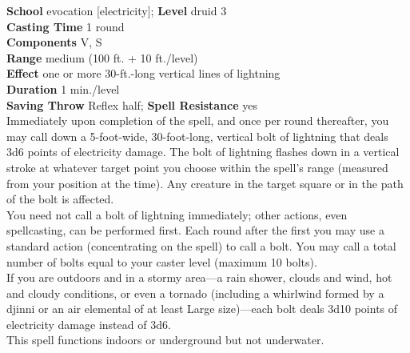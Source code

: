\textbf{School} evocation [electricity]; \textbf{Level} druid 3\\
\textbf{Casting Time} 1 round\\
\textbf{Components} V, S\\
\textbf{Range }medium (100 ft. + 10 ft./level)\\
\textbf{Effect} one or more 30-ft.-long vertical lines of lightning\\
\textbf{Duration} 1 min./level\\
\textbf{Saving Throw} Reflex half; \textbf{Spell Resistance} yes\\
Immediately upon completion of the spell, and once per round thereafter, you may call down a 5-foot-wide, 30-foot-long, vertical bolt of lightning that deals 3d6 points of electricity damage. The bolt of lightning flashes down in a vertical stroke at whatever target point you choose within the spell's range (measured from your position at the time). Any creature in the target square or in the path of the bolt is affected.\\
You need not call a bolt of lightning immediately; other actions, even spellcasting, can be performed first. Each round after the first you may use a standard action (concentrating on the spell) to call a bolt. You may call a total number of bolts equal to your caster level (maximum 10 bolts).\\
If you are outdoors and in a stormy area---a rain shower, clouds and wind, hot and cloudy conditions, or even a tornado (including a whirlwind formed by a djinni or an air elemental of at least Large size)---each bolt deals 3d10 points of electricity damage instead of 3d6.\\
This spell functions indoors or underground but not underwater.\\
